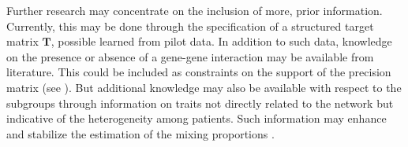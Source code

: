 \documentclass[10pt]{article}
\begin{document}
Further research may concentrate on the inclusion of more, prior information. Currently, this may be done through the specification of a structured target matrix $\mathbf{T}$, possible learned from pilot data. In addition to such data, knowledge on the presence or absence of a gene-gene interaction may be available from literature. This could be included as constraints on the support of the precision matrix (see \citet{miok2016ridge}). But additional knowledge may also be available with respect to the subgroups through information on traits not directly related to the network but indicative of the heterogeneity among patients. Such information may enhance and stabilize the estimation of the mixing proportions \citep{aflak2017}. 










\setlength{\bibsep}{2pt}
% 
% 


% 
% 

\setlength{\bibsep}{2pt}


\newpage
\end{document}
